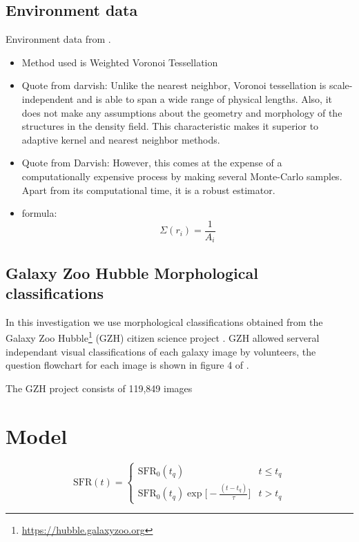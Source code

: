 \documentclass[a4paper,fleqn,usenatbib]{mnras}
\begin{document}
   

   \subsection{Environment data}
   
   Environment data from \cite{darvish2015}.

   \begin{itemize}
      \item Method used is Weighted Voronoi Tessellation
      \item  Quote from darvish: Unlike the nearest neighbor, Voronoi tessellation is scale-independent and is able to span a wide range of physical lengths. Also, it
does not make any assumptions about the geometry and
morphology of the structures in the density field. This
characteristic makes it superior to adaptive kernel and
nearest neighbor methods.

       \item  Quote from Darvish: However, this comes at the expense
of a computationally expensive process by
making several Monte-Carlo samples. Apart from
its computational time, it is a robust estimator.

      \item formula: \begin{equation}\Sigma(r_{i})=\frac{1}{A_{i}}\end{equation}
   \end{itemize}


   \subsection{Galaxy Zoo Hubble Morphological classifications}
   
   In this investigation we use morphological classifications obtained from the Galaxy Zoo Hubble\footnote{\url{https://hubble.galaxyzoo.org}} (GZH) citizen 
   science project \citep{galaxyzooHubble}. GZH allowed serveral independant visual classifications of each galaxy image by volunteers, the question flowchart for each
   image is shown in figure 4 of \cite{galaxyzooHubble}.

   The GZH project consists of 119,849 images 
   
\section{Model}

   \begin{equation}
      \text{SFR}(t) = \begin{cases}
                \text{SFR}_{0}(t_{q}) & t \leq t_{q} \\
                \text{SFR}_{0}(t_{q})\exp\bigg[-\frac{(t-t_{q})}{\tau}\bigg] & t > t_{q} 
               \end{cases}
       \label{eq:model}
   \end{equation}
\end{document}
